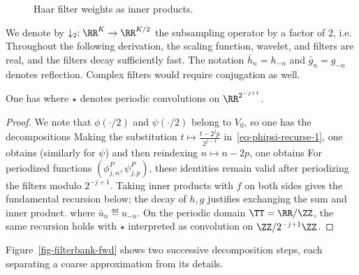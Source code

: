 \begin{figure}[tbp]
\centering
{}
\caption{Haar filter weights as inner products.}
\label{fig-haar-inner}
\end{figure}


We denote by $\downarrow_2 : \RR^K \rightarrow \RR^{K/2}$ the subsampling operator by a factor of 2, i.e.
Throughout the following derivation, the scaling function, wavelet, and filters are real, and the filters decay sufficiently fast. The notation $\bar h_n=h_{-n}$ and $\bar g_n=g_{-n}$ denotes reflection. Complex filters would require conjugation as well.

\begin{prop}
One has
where $\star$ denotes periodic convolutions on $\RR^{2^{-j+1}}$.
\end{prop}

\begin{proof}
We note that $\phi(\cdot/2)$ and $\psi(\cdot/2)$ belong to $V_0$, so one has the decompositions
Making the substitution $t \mapsto \frac{t-2^j p}{2^{j-1}}$ in~\eqref{eq-phipsi-recurse-1}, one obtains
(similarly for $\psi$) and then reindexing $n \mapsto n-2p$, one obtains
For periodized functions $(\phi_{j,n}^P,\psi_{j,p}^P)$, these identities remain valid after periodizing the filters modulo $2^{-j+1}$.
%
Taking inner products with $f$ on both sides gives the fundamental recursion below; the decay of $h,g$ justifies exchanging the sum and inner product.
where $\bar u_n \eqdef u_{-n}$. 
%
On the periodic domain $\TT=\RR/\ZZ$, the same recursion holds with $\star$ interpreted as convolution on $\ZZ/2^{-j+1}\ZZ$.
\end{proof}

Figure~\ref{fig-filterbank-fwd} shows two successive decomposition steps, each separating a coarse approximation from its details.

